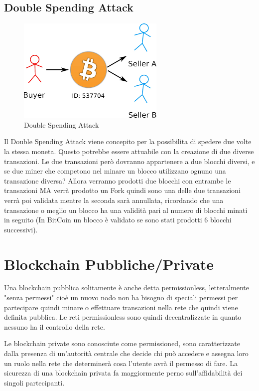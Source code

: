 \documentclass[12pt]{report}
\begin{document}
\subsection{Double Spending Attack}
\begin{figure}[h]
	\includegraphics[height=0.2\textheight]{dsa}
	\centering
	\caption{Double Spending Attack}
	\label{fig:ds-attack}
\end{figure}
Il Double Spending Attack viene concepito per la possibilita di spedere due volte la stessa moneta. Questo potrebbe essere attuabile con la creazione di due diverse transazioni. Le due transazioni però dovranno appartenere a due blocchi diversi, e se due miner che competono nel minare un blocco utilizzano ognuno una transazione diversa? Allora verranno prodotti due blocchi con entrambe le transazioni MA verrà prodotto un Fork quindi sono una delle due transazioni verrà poi validata mentre la seconda sarà annullata, ricordando che una transazione o meglio un blocco ha una validità pari al numero di blocchi minati in seguito (In BitCoin un blocco è validato se sono stati prodotti 6 blocchi successivi).

\section{Blockchain Pubbliche/Private}
Una blockchain pubblica solitamente è anche detta permissionless, letteralmente "senza permessi" cioè un nuovo nodo non ha bisogno di speciali permessi per partecipare quindi minare o effettuare transazioni nella rete che quindi viene definita pubblica. Le reti permissionless sono quindi decentralizzate in quanto nessuno ha il controllo della rete.

Le blockchain private sono conosciute come permissioned, sono caratterizzate dalla presenza di un’autorità centrale che decide chi può accedere e assegna loro un ruolo nella rete che determinerà cosa l’utente avrà il permesso di fare. La sicurezza di una blockchain privata fa maggiormente perno sull'affidabilità dei singoli partecipanti.
\end{document}
